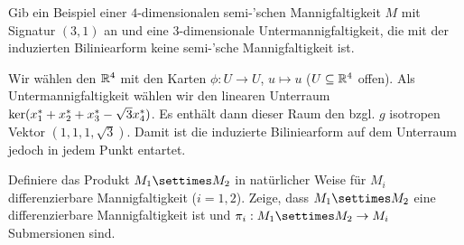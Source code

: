 \documentclass{article}
\begin{document}
\begin{exercise}
    Gib ein Beispiel einer $4$-dimensionalen semi-'schen Mannigfaltigkeit $M$ mit Signatur $(3,1)$ an und eine $3$-dimensionale Untermannigfaltigkeit, die mit der induzierten Biliniearform keine semi-'sche Mannigfaltigkeit ist.
\end{exercise}

\begin{solution}%
    Wir wählen den $\mathbb{R}^4$ mit den Karten $\phi:U\to U$, $u\mapsto u$ ($U\subseteq \mathbb{R}^4$ offen). Als Untermannigfaltigkeit wählen wir den linearen Unterraum $\ker({x}^{\ast}_1+{x}^{\ast}_2+{x}^{\ast}_3 - \sqrt 3{x}^{\ast}_4)$. Es enthält dann dieser Raum den bzgl. $g$ isotropen Vektor $(1,1,1,\sqrt 3)$. Damit ist die induzierte Biliniearform auf dem Unterraum jedoch in jedem Punkt entartet.
\end{solution}

\begin{exercise}
    Definiere das Produkt $M_1\settimes M_2$ in natürlicher Weise für $M_i$ differenzierbare Mannigfaltigkeit ($i=1,2$). Zeige, dass $M_1\settimes M_2$ eine differenzierbare Mannigfaltigkeit ist und $\pi_i:M_1\settimes M_2\to M_i$ Submersionen sind.
\end{exercise}
\end{document}
